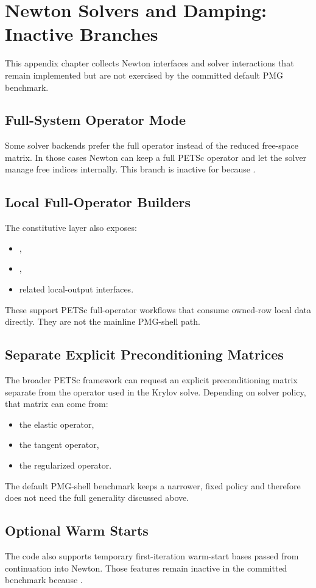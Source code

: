 \chapter{Newton Solvers and Damping: Inactive Branches}
\label{app:newton}

This appendix chapter collects Newton interfaces and solver interactions that
remain implemented but are not exercised by the committed default PMG
benchmark.

\section{Full-System Operator Mode}

Some solver backends prefer the full operator instead of the reduced free-space
matrix. In those cases Newton can keep a full PETSc operator and let the solver
manage free indices internally. This branch is inactive for 
because .

\section{Local Full-Operator Builders}

The constitutive layer also exposes:
\begin{itemize}
\item {},
\item {},
\item related local-output interfaces.
\end{itemize}

These support PETSc full-operator workflows that consume owned-row local data
directly. They are not the mainline PMG-shell path.

\section{Separate Explicit Preconditioning Matrices}

The broader PETSc framework can request an explicit preconditioning matrix
separate from the operator used in the Krylov solve. Depending on solver policy,
that matrix can come from:
\begin{itemize}
\item the elastic operator,
\item the tangent operator,
\item the regularized operator.
\end{itemize}

The default PMG-shell benchmark keeps a narrower, fixed policy and therefore
does not need the full generality discussed above.

\section{Optional Warm Starts}

The code also supports temporary first-iteration warm-start bases passed from
continuation into Newton. Those features remain inactive in the committed
benchmark because .
